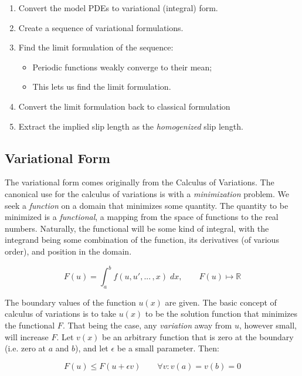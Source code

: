 \documentclass[a4paper]{report}
\begin{document}
\begin{enumerate}
\item Convert the model PDEs to variational (integral) form.
\item Create a sequence of variational formulations.
\item Find the limit formulation of the sequence:
\begin{itemize}
    \item Periodic functions weakly converge to their mean;
    \item This lets us find the limit formulation.
\end{itemize}
      
\item Convert the limit formulation back to classical formulation
\item Extract the implied slip length as the \emph{homogenized} slip length.
\end{enumerate}



\subsection*{Variational Form}

The variational form comes originally from the Calculus of Variations.  The canonical use for the calculus of variations is with a \emph{minimization} problem.  We seek a \emph{function} on a domain that minimizes some quantity.  The quantity to be minimized is a \emph{functional}, a mapping from the space of functions to the real numbers.  Naturally, the functional will be some kind of integral, with the integrand being some combination of the function, its derivatives (of various order), and position in the domain.

\begin{equation}
F(u) = \int_a^b f(u,u', ...\, ,x) \; dx,  \qquad F(u) \mapsto \mathbb{R}
\end{equation} 

The boundary values of the function $u(x)$ are given.  The basic concept of calculus of variations is to take $u(x)$ to be the solution function that minimizes the functional $F$.  That being the case, any \emph{variation} away from $u$, however small, will increase $F$.  Let $v(x)$ be an arbitrary function that is zero at the boundary (i.e. zero at $a$ and $b$), and let $\epsilon$ be a small parameter. Then:

\begin{equation}
F(u) \leq F(u + \epsilon v) \qquad \forall v: v(a) = v(b) = 0
\end{equation}
\end{document}
